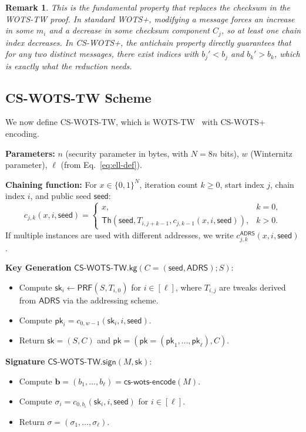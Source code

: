 \documentclass[11pt,a4paper]{article}
\newtheorem{remark}[theorem]{Remark}
\newcommand{\Th}{\mathsf{Th}}
\newcommand{\bits}{\{0,1\}}
\newcommand{\pk}{\mathsf{pk}}
\newcommand{\sk}{\mathsf{sk}}
\newcommand{\SK}{\mathsf{sk}}
\newcommand{\PK}{\mathsf{pk}}
\newcommand{\seed}{\mathsf{seed}}
\newcommand{\ADRS}{\mathsf{ADRS}}
\newcommand{\PRF}{\mathsf{PRF}}
\newcommand{\Nbits}{N}
\begin{document}
\begin{remark}
This is the fundamental property that \emph{replaces the checksum} in the WOTS-TW proof. In standard WOTS+, modifying a message forces an increase in some $m_i$ and a decrease in some checksum component $C_j$, so at least one chain index decreases. In CS-WOTS+, the antichain property directly guarantees that for any two distinct messages, there exist indices with $b_j' < b_j$ and $b_k' > b_k$, which is exactly what the reduction needs.
\end{remark}

\subsection{CS-WOTS-TW Scheme}

We now define CS-WOTS-TW, which is WOTS-TW~\cite[Section~3]{HK22} with CS-WOTS+ encoding.

\medskip\noindent\textbf{Parameters:} $n$ (security parameter in bytes, with $\Nbits=8n$ bits), $w$ (Winternitz parameter), $\ell$ (from Eq.~\eqref{eq:ell-def}).

\medskip\noindent\textbf{Chaining function:} For $x \in \bits^\Nbits$, iteration count $k \ge 0$, start index $j$, chain index $i$, and public seed $\seed$:
\[
c_{j,k}(x, i, \seed) = \begin{cases}
x, & k = 0,\\
\Th(\seed, T_{i,j+k-1}, c_{j,k-1}(x, i, \seed)), & k > 0.
\end{cases}
\]
If multiple instances are used with different addresses, we write $c^{\ADRS}_{j,k}(x,i,\seed)$.

\medskip\noindent\textbf{Key Generation} $\mathsf{CS\text{-}WOTS\text{-}TW.kg}(C = (\seed, \ADRS); S)$:
\begin{itemize}
    \item Compute $\sk_i \gets \PRF(S, T_{i,0})$ for $i \in [\ell]$, where $T_{i,j}$ are tweaks derived from $\ADRS$ via the addressing scheme.
    \item Compute $\pk_i = c_{0,w-1}(\sk_i, i, \seed)$.
    \item Return $\SK = (S, C)$ and $\PK = (\pk = (\pk_1,\ldots,\pk_\ell), C)$.
\end{itemize}

\medskip\noindent\textbf{Signature} $\mathsf{CS\text{-}WOTS\text{-}TW.sign}(M, \SK)$:
\begin{itemize}
    \item Compute $\mathbf{b} = (b_1,\ldots,b_\ell) = \mathsf{cs\text{-}wots\text{-}encode}(M)$.
    \item Compute $\sigma_i = c_{0,b_i}(\sk_i, i, \seed)$ for $i \in [\ell]$.
    \item Return $\sigma = (\sigma_1,\ldots,\sigma_\ell)$.
\end{itemize}
\end{document}
